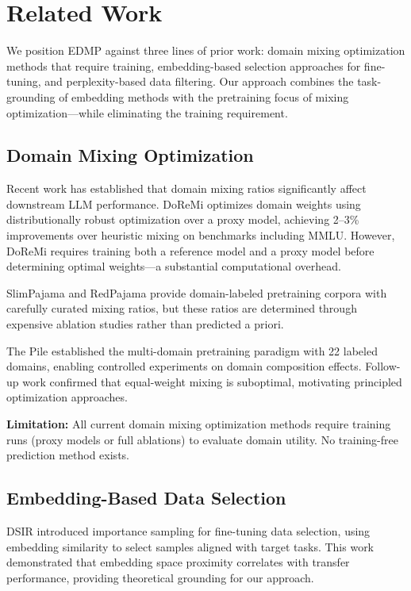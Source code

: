 \section{Related Work}
\label{sec:related}

We position EDMP against three lines of prior work: domain mixing optimization methods that require training, embedding-based selection approaches for fine-tuning, and perplexity-based data filtering. Our approach combines the task-grounding of embedding methods with the pretraining focus of mixing optimization---while eliminating the training requirement.

\subsection{Domain Mixing Optimization}

Recent work has established that domain mixing ratios significantly affect downstream LLM performance. DoReMi \cite{xie2023doremi} optimizes domain weights using distributionally robust optimization over a proxy model, achieving 2--3\% improvements over heuristic mixing on benchmarks including MMLU. However, DoReMi requires training both a reference model and a proxy model before determining optimal weights---a substantial computational overhead.

SlimPajama \cite{soboleva2023slimpajama} and RedPajama \cite{together2023redpajama} provide domain-labeled pretraining corpora with carefully curated mixing ratios, but these ratios are determined through expensive ablation studies rather than predicted a priori.

The Pile \cite{gao2020pile} established the multi-domain pretraining paradigm with 22 labeled domains, enabling controlled experiments on domain composition effects. Follow-up work confirmed that equal-weight mixing is suboptimal, motivating principled optimization approaches.

\textbf{Limitation:} All current domain mixing optimization methods require training runs (proxy models or full ablations) to evaluate domain utility. No training-free prediction method exists.

\subsection{Embedding-Based Data Selection}

DSIR \cite{xie2023dsir} introduced importance sampling for fine-tuning data selection, using embedding similarity to select samples aligned with target tasks. This work demonstrated that embedding space proximity correlates with transfer performance, providing theoretical grounding for our approach.

